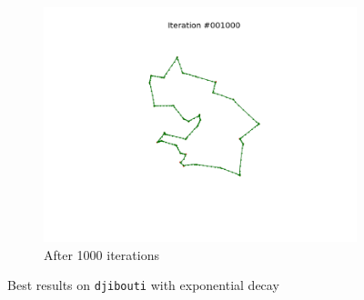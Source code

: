 \documentclass[11pt]{article}
\begin{document}
\begin{figure}
\begin{subfigure}{.33\textwidth}
  \includegraphics[trim={6cm 2cm 6cm 2cm}, clip=true,width=\linewidth]{d_1000.png}
  \caption{After 1000 iterations}
\end{subfigure}
\caption{Best results on \texttt{djibouti} with exponential decay}
\label{fig:bdjibouti}

\end{figure}
\end{document}
